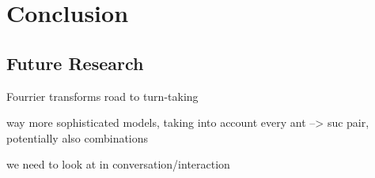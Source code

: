 

\chapter{Conclusion}
\label{ch:con}
\section{Future Research}
\label{sec:confut}
Fourrier transforms
road to turn-taking

way more sophisticated models, taking into account every ant --> suc pair, potentially also combinations

we need to look at \rt in conversation/interaction